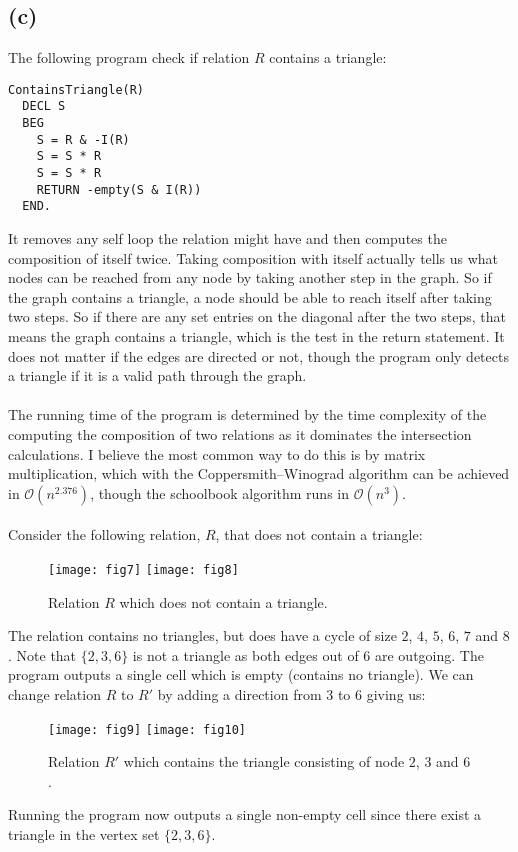 \documentclass[a4paper, fleqn]{article}
\begin{document}
\subsection{(c)}
The following program check if relation $R$ contains a triangle:
\begin{verbatim}
ContainsTriangle(R)
  DECL S
  BEG
    S = R & -I(R)
    S = S * R
    S = S * R
    RETURN -empty(S & I(R))
  END.
\end{verbatim}
It removes any self loop the relation might have and then computes the composition of
itself twice. Taking composition with itself actually tells us what nodes can be
reached from any node by taking another step in the graph. So if the graph contains a
triangle, a node should be able to reach itself after taking two steps. So if there are
any set entries on the diagonal after the two steps, that means the graph contains a
triangle, which is the test in the return statement. It does not matter if the edges are
directed or not, though the program only detects a triangle if it is a valid path through
the graph.\\
\\
The running time of the program is determined by the time complexity of the computing the
composition of two relations as it dominates the intersection calculations. I believe the
most common way to do this is by matrix multiplication, which with the
Coppersmith–Winograd algorithm can be achieved in $\mathcal{O}(n^{2.376})$, though the
schoolbook algorithm runs in $\mathcal{O}(n^3)$. \\
\\
Consider the following relation, $R$, that does not contain a triangle:
\begin{figure}[H]
  \centering
  \texttt{[image: fig7]}
  \texttt{[image: fig8]}
  \caption{Relation $R$ which does not contain a triangle.}
\end{figure}
The relation contains no triangles, but does have a cycle of size $2$, $4$, $5$, $6$, $7$
and $8$. Note that $\{2,3,6\}$ is not a triangle as both edges out of $6$ are outgoing.
The program outputs a single cell which is empty (contains no triangle). We can change
relation $R$ to $R'$ by adding a direction from $3$ to $6$ giving us:
\begin{figure}[H]
  \centering
  \texttt{[image: fig9]}
  \texttt{[image: fig10]}
  \caption{Relation $R'$ which contains the triangle consisting of node $2$, $3$ and $6$.}
\end{figure}
Running the program now outputs a single non-empty cell since there exist a triangle in the
vertex set $\{2,3,6\}$.
\end{document}
